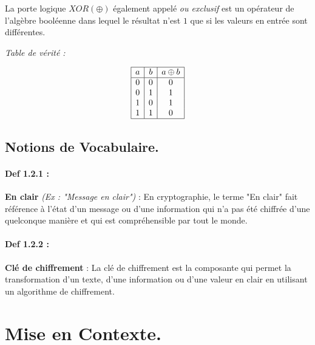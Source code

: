 \documentclass{article}
\begin{document}
La porte logique \(XOR (\oplus)\) également appelé \textit{ou exclusif}
est un opérateur de l'algèbre booléenne dans lequel le résultat n'est
\(1\) que si les valeurs en entrée sont différentes.
\begin{center}
	\textit{Table de vérité :}
\end{center}
 \[
\begin{array}{|c|c|c|}
	\hline
	a & b & a \oplus b \\
	\hline
	0 & 0 & 0 \\
	0 & 1 & 1 \\
	1 & 0 & 1 \\
	1 & 1 & 0 \\
	\hline
\end{array}
\]

\subsection{Notions de Vocabulaire.}\label{notions-de-vocabulaire.}

\paragraph{Def 1.2.1 :}\label{def-1.2.1}

\textbf{En clair} \textit{(Ex : "Message en clair")} : En cryptographie,
le terme "En clair" fait référence à l'état d'un message ou d'une
information qui n'a pas été chiffrée d'une quelconque manière et qui est
compréhensible par tout le monde.

\paragraph{Def 1.2.2 :}\label{def-1.2.2}

\textbf{Clé de chiffrement} : La clé de chiffrement est la composante
qui permet la transformation d'un texte, d'une information ou d'une
valeur en clair en utilisant un algorithme de chiffrement.

\section{Mise en Contexte.}\label{contexte.}
\end{document}
